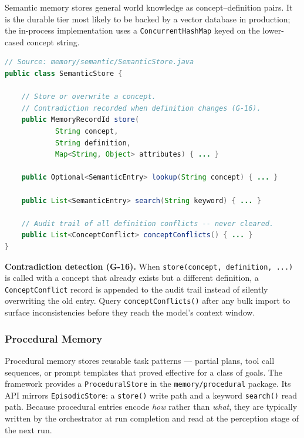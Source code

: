 Semantic memory stores general world knowledge as concept--definition
pairs.  It is the durable tier most likely to be backed by a vector
database in production; the in-process implementation uses a
\texttt{ConcurrentHashMap} keyed on the lower-cased concept string.

\begin{lstlisting}[language=Java,
  caption={\texttt{SemanticStore} --- concept store with contradiction
           detection (\texttt{memory/semantic/SemanticStore.java})},
  label={lst:semantic-store}]
// Source: memory/semantic/SemanticStore.java
public class SemanticStore {

    // Store or overwrite a concept.
    // Contradiction recorded when definition changes (G-16).
    public MemoryRecordId store(
            String concept,
            String definition,
            Map<String, Object> attributes) { ... }

    public Optional<SemanticEntry> lookup(String concept) { ... }

    public List<SemanticEntry> search(String keyword) { ... }

    // Audit trail of all definition conflicts -- never cleared.
    public List<ConceptConflict> conceptConflicts() { ... }
}
\end{lstlisting}

\begin{notebox}
\textbf{Contradiction detection (G-16).}  When
\texttt{store(concept, definition, ...)} is called with a concept
that already exists but a different definition, a
\texttt{ConceptConflict} record is appended to the audit trail
instead of silently overwriting the old entry.  Query
\texttt{conceptConflicts()} after any bulk import to surface
inconsistencies before they reach the model's context window.
\end{notebox}

\subsubsection*{Procedural Memory}

Procedural memory stores reusable task patterns — partial plans, tool
call sequences, or prompt templates that proved effective for a class of
goals.  The framework provides a \texttt{ProceduralStore} in the
\texttt{memory/procedural} package.  Its API mirrors
\texttt{EpisodicStore}: a \texttt{store()} write path and a keyword
\texttt{search()} read path.  Because procedural entries encode
\emph{how} rather than \emph{what}, they are typically written by the
orchestrator at run completion and read at the perception stage of the
next run.

